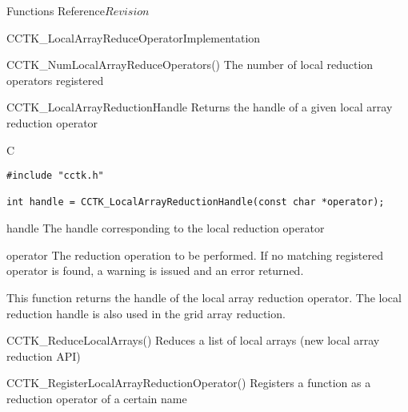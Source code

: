 \begin{cactuspart}{ Functions Reference}{}{$Revision$}
\begin{FunctionDescription}{CCTK\_LocalArrayReduceOperatorImplementation}
\begin{SeeAlsoSection}
\begin{SeeAlso}{CCTK\_NumLocalArrayReduceOperators()}
The number of local reduction operators registered
\end{SeeAlso}
\end{SeeAlsoSection}
\end{FunctionDescription}

\begin{FunctionDescription}{CCTK\_LocalArrayReductionHandle}
\label{CCTK-LocalArrayReductionHandle}
Returns the handle of a given local array reduction operator

\begin{SynopsisSection}
\begin{Synopsis}{C}
\begin{verbatim}
#include "cctk.h"

int handle = CCTK_LocalArrayReductionHandle(const char *operator);
\end{verbatim}
\end{Synopsis}
\end{SynopsisSection}

\begin{ResultSection}
\begin{Result}{handle}
The handle corresponding to the local reduction operator
\end{Result}
\end{ResultSection}

\begin{ParameterSection}
\begin{Parameter}{operator}
The reduction operation to be performed. If no matching registered operator
is found, a warning is issued and an error returned.
\end{Parameter}
\end{ParameterSection}

\begin{Discussion}
This function returns the handle of the local array reduction operator. The local
reduction handle is also used in the grid array reduction.
\end{Discussion}

\begin{SeeAlsoSection}
\begin{SeeAlso}{CCTK\_ReduceLocalArrays()}
Reduces a list of local arrays (new local array reduction API)
\end{SeeAlso}

\begin{SeeAlso}{CCTK\_RegisterLocalArrayReductionOperator()}
Registers a function as a reduction operator of a certain name
\end{SeeAlso}


\end{SeeAlsoSection}
\end{FunctionDescription}
\end{cactuspart}
